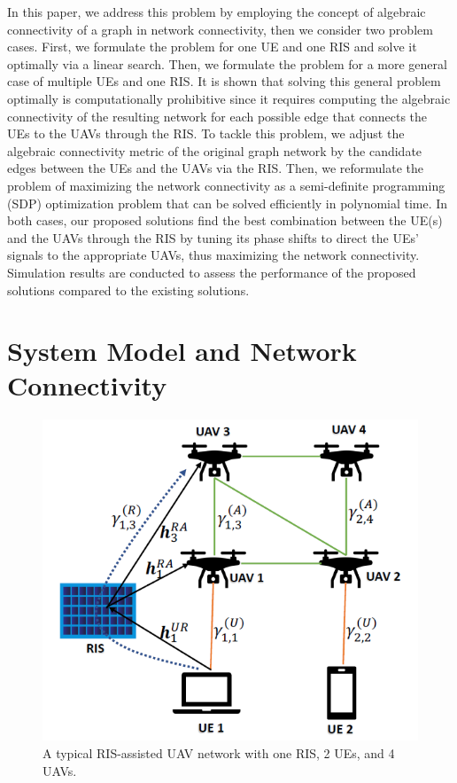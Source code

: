 \documentclass[conference]{IEEEtran}
\begin{document}
In this paper, we address this problem by employing the concept of 
algebraic connectivity \cite{new} of a graph in network connectivity, then we consider two problem cases. First, we formulate the problem for one UE and one RIS and solve it optimally via a linear search. Then, we formulate the problem for a more general case of multiple UEs and one RIS. It is shown that solving this general problem optimally is computationally prohibitive since it requires computing the algebraic connectivity of the resulting network for  each possible edge that connects the UEs to the UAVs through the RIS. To tackle this problem, we adjust the algebraic connectivity metric of the original graph network by the candidate edges between the UEs and the UAVs via the RIS. Then, we reformulate  the problem of maximizing the network connectivity as a semi-definite programming (SDP) optimization problem that can be solved efficiently in polynomial time. In both cases, our proposed solutions find the best combination between the UE(s) and the UAVs through the RIS by tuning its  phase shifts  to direct the UEs' signals to the appropriate UAVs, thus maximizing the network connectivity. Simulation results are conducted to assess the performance of the proposed solutions compared to the existing solutions.





\section{System Model and Network Connectivity}\label{S}
\begin{figure}[t!]
			\begin{center}
				\includegraphics[width=0.65\linewidth, draft=false]{alg4.png}
				\caption{A typical RIS-assisted UAV network with one RIS, 2 UEs, and 4 UAVs.}
     \vspace{-5.5mm}
			\end{center}
   \label{fig2}
		\end{figure}
  
\end{document}
